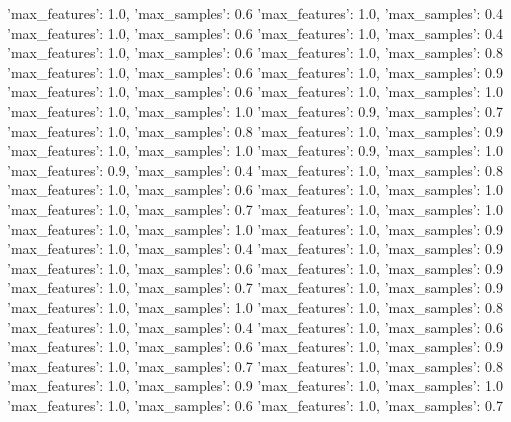 {'max_features': 1.0, 'max_samples': 0.6}
{'max_features': 1.0, 'max_samples': 0.4}
{'max_features': 1.0, 'max_samples': 0.6}
{'max_features': 1.0, 'max_samples': 0.4}
{'max_features': 1.0, 'max_samples': 0.6}
{'max_features': 1.0, 'max_samples': 0.8}
{'max_features': 1.0, 'max_samples': 0.6}
{'max_features': 1.0, 'max_samples': 0.9}
{'max_features': 1.0, 'max_samples': 0.6}
{'max_features': 1.0, 'max_samples': 1.0}
{'max_features': 1.0, 'max_samples': 1.0}
{'max_features': 0.9, 'max_samples': 0.7}
{'max_features': 1.0, 'max_samples': 0.8}
{'max_features': 1.0, 'max_samples': 0.9}
{'max_features': 1.0, 'max_samples': 1.0}
{'max_features': 0.9, 'max_samples': 1.0}
{'max_features': 0.9, 'max_samples': 0.4}
{'max_features': 1.0, 'max_samples': 0.8}
{'max_features': 1.0, 'max_samples': 0.6}
{'max_features': 1.0, 'max_samples': 1.0}
{'max_features': 1.0, 'max_samples': 0.7}
{'max_features': 1.0, 'max_samples': 1.0}
{'max_features': 1.0, 'max_samples': 1.0}
{'max_features': 1.0, 'max_samples': 0.9}
{'max_features': 1.0, 'max_samples': 0.4}
{'max_features': 1.0, 'max_samples': 0.9}
{'max_features': 1.0, 'max_samples': 0.6}
{'max_features': 1.0, 'max_samples': 0.9}
{'max_features': 1.0, 'max_samples': 0.7}
{'max_features': 1.0, 'max_samples': 0.9}
{'max_features': 1.0, 'max_samples': 1.0}
{'max_features': 1.0, 'max_samples': 0.8}
{'max_features': 1.0, 'max_samples': 0.4}
{'max_features': 1.0, 'max_samples': 0.6}
{'max_features': 1.0, 'max_samples': 0.6}
{'max_features': 1.0, 'max_samples': 0.9}
{'max_features': 1.0, 'max_samples': 0.7}
{'max_features': 1.0, 'max_samples': 0.8}
{'max_features': 1.0, 'max_samples': 0.9}
{'max_features': 1.0, 'max_samples': 1.0}
{'max_features': 1.0, 'max_samples': 0.6}
{'max_features': 1.0, 'max_samples': 0.7}
